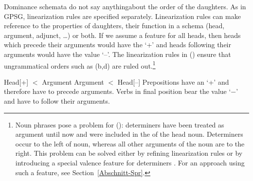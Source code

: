Dominance schemata do not say anything\indexgpsg about the order of the daughters. As in GPSG, linearization rules are specified separately.
Linearization rules can make reference to the properties of daughters, their function in a schema (head, argument,
adjunct, \ldots) or both.
If we assume a feature \initial{} for all heads, then heads which precede their arguments would have the \initialv `+' and heads following their
  arguments would have the value `--'. The linearization rules in () ensure that ungrammatical orders such as (b,d) are
  ruled out.\footnote{
  Noun phrases pose a problem for (): determiners have been treated as argument until now and were included in the \subcatl of the
  head noun. Determiners occur to the left of noun, whereas all other arguments of the noun are to the right. This problem can be solved either
  by refining linearization rules \citep[--165]{Mueller99a} or by introducing a special valence feature for determiners
  \citep[Section~9.4]{ps2}. For an approach using such a
  feature, see Section~\ref{Abschnitt-Spr}.%
}

\eal
\ex\label{lp-ini-arg} 
Head[\initial+] $<$ Argument
\ex 
Argument $<$ Head[\initial --]
\zl
Prepositions have an \initialv `+' and therefore have to precede arguments. Verbs in final position bear the value `$-$' and have to follow
their arguments.
\eal
{}
\ex[*]{
\gll {}[[den Schrank] in]\\
     \hspaceThis{[[}the cupboard in\\
}
\zl

